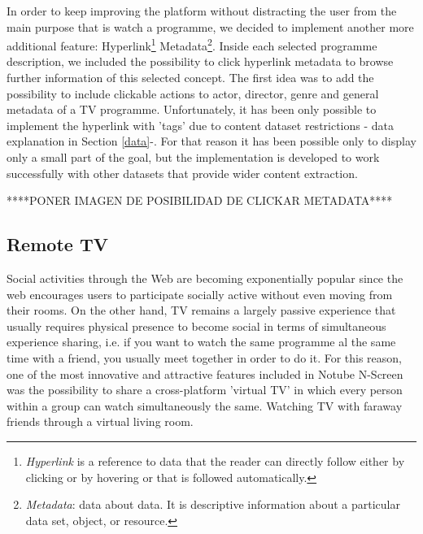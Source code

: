 \documentclass{acm_proc_article-sp}
\begin{document}
In order to keep improving the platform without distracting the user from the main purpose\cite{allen2012smashing} that is watch a programme, we decided to implement another more additional feature: Hyperlink\footnote{\textit{Hyperlink} is a reference to data that the reader can directly follow either by clicking or by hovering or that is followed automatically.} Metadata\footnote{\textit{Metadata}: data about data. It is descriptive information about a particular data set, object, or resource.}. Inside each selected programme description, we included the possibility to click hyperlink metadata to browse further information of this selected concept. The first idea was to add the possibility to include clickable actions to actor, director, genre and general metadata of a TV programme. Unfortunately, it has been only possible to implement the hyperlink with 'tags'  due to content dataset restrictions - data explanation in Section \ref{data}-. For that reason it has been possible only to display only a small part of the goal, but the implementation is developed to work successfully with other datasets that provide wider content extraction.

****PONER IMAGEN DE POSIBILIDAD DE CLICKAR METADATA****

\subsection{Remote TV}

Social activities through the Web are becoming exponentially popular since the web encourages users to  participate socially active without even moving from their rooms\cite{schopman2010notube}. On the other hand, TV remains a largely passive experience that usually requires physical presence to become social in terms of simultaneous experience sharing, i.e. if you want to watch the same programme al the same time with a friend, you usually meet together in order to do it. For this reason, one of the most innovative and attractive features included in Notube N-Screen was the possibility to share a cross-platform 'virtual TV' in which every person within a group can watch simultaneously the same. Watching TV with faraway friends through a virtual living room.
\end{document}
